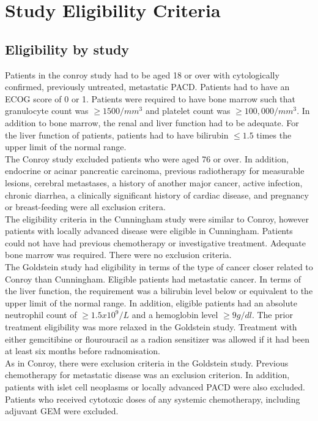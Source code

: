 \section{Study Eligibility Criteria}
\subsection{Eligibility by study}
Patients in the conroy study had to be aged 18 or over with cytologically confirmed, previously untreated, metastatic PACD. Patients had to have an ECOG score of 0 or 1. Patients were required to have bone marrow such that granulocyte count was $\geq1500/mm^3$ and platelet count was $\geq100,000/mm^3$. In addition to bone marrow, the renal and liver function had to be adequate. For the liver function of patients, patients had to have bilirubin $\leq 1.5$ times the upper limit of the normal range. \\

The Conroy study excluded patients who were aged 76 or over. In addition, endocrine or acinar pancreatic carcinoma, previous radiotherapy for measurable lesions, cerebral metastases, a history of another major cancer, active infection, chronic diarrhea, a clinically significant history of cardiac disease, and pregnancy or breast-feeding were all exclusion critera. \\

The eligibility criteria in the Cunningham study were similar to Conroy, however patients with locally advanced disease were eligible in Cunningham. Patients could not have had previous chemotherapy or investigative treatment. Adequate bone marrow was required. There were no exclusion criteria. \\

The Goldstein study had eligibility in terms of the type of cancer closer related to Conroy than Cunningham. Eligible patients had metastatic cancer. In terms of the liver function, the requirement was a bilirubin level below or equivalent to the upper limit of the normal range. In addition, eligible patients had an absolute neutrophil count of $\geq 1.5x10^9/L$ and a hemoglobin level $\geq 9g/dl$. The prior treatment eligibility was more relaxed in the Goldstein study. Treatment with either gemcitibine or flourouracil as a radion sensitizer was allowed if it had been at least six months before radnomisation. \\

As in Conroy, there were exclusion criteria in the Goldstein study. Previous chemotherapy for metastatic disease was an exclusion criterion. In addition, patients with islet cell neoplasms or locally advanced PACD were also excluded. Patients who received cytotoxic doses of any systemic
chemotherapy, including adjuvant GEM were excluded. \\

